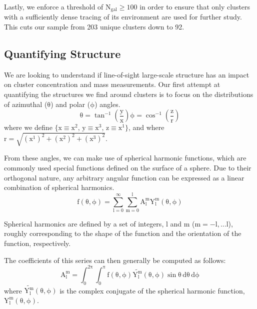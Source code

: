 Lastly, we enforce a threshold of $\mathrm{N_{gal} \ge 100}$ in order to ensure
that only clusters with a sufficiently dense tracing of its environment are
used for further study. This cuts our sample from 203 unique clusters down to 92.

\subsection{Quantifying Structure}
We are looking to understand if line-of-sight large-scale structure has an
impact on cluster concentration and mass measurements. Our first attempt at
quantifying the structures we find around clusters is to focus on the
distributions of azimuthal ($\mathrm{\theta}$) and polar ($\mathrm{\phi}$)
angles.
 \begin{subequations}
\begin{equation}
\mathrm{\theta = \tan^{-1} \left( \frac{y}{x} \right)}
\end{equation}    
\begin{equation}
\mathrm{\phi = \cos^{-1} \left( \frac{z}{r} \right)}
\end{equation}
\end{subequations}
where we define $\mathrm{ \{ x\equiv x^{2},\, y\equiv x^{3},\, z\equiv x^{1}
    \} }$, and where $\mathrm{r = \sqrt{(x^{1})^{2} + (x^{2})^{2} +
    (x^{3})^{2}}}$.

From these angles, we can make use of spherical harmonic functions, which
are commonly used special functions defined on the surface of a sphere. Due to
their orthogonal nature, any arbitrary angular function can be expressed
as a linear combination of spherical harmonics.
\begin{equation}
\mathrm{f(\theta,\phi) = \sum_{l=0}^{\infty} \sum_{m=0}^{l} A_{l}^{m}
  Y_{l}^{m} (\theta,\phi)}
\end{equation}

Spherical harmonics are defined by a set of integers, $\mathrm{l}$ and
$\mathrm{m}$ ($\mathrm{m=-l,...l}$), roughly corresponding to the shape of the
function and the orientation of the function, respectively.

The coefficients of this series can then generally be computed as follows:
\begin{equation}
\mathrm{A_{l}^{m} = \int_{0}^{2\pi}\int_{0}^{\pi} f(\theta,\phi)
  \tilde{Y_{l}^{m}}(\theta,\phi) \sin \theta\, d\theta\, d\phi}
\end{equation}
where $\mathrm{\tilde{Y_{l}^{m}}(\theta,\phi)}$ is the complex conjugate of the spherical
harmonic function, $\mathrm{Y_{l}^{m}(\theta,\phi)}$.

